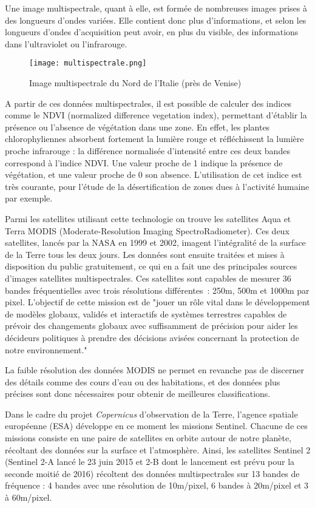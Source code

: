 Une image multispectrale, quant à elle, est formée de nombreuses images prises à des longueurs d'ondes variées. Elle contient donc plus d'informations, et selon les longueurs d'ondes d'acquisition peut avoir, en plus du visible, des informations dans l'ultraviolet ou l'infrarouge.

\begin{figure}
  \centering
    \texttt{[image: multispectrale.png]}
  \caption{Image multispectrale du Nord de l'Italie (près de Venise)}
  \label{fig:veniseMulti}
\end{figure}

A partir de ces données multispectrales, il est possible de calculer des indices comme le NDVI (normalized difference vegetation index), permettant d'établir la présence ou l'absence de végétation dans une zone. En effet, les plantes chlorophyliennes absorbent fortement la lumière rouge et réfléchissent la lumière proche infrarouge : la différence normalisée d'intensité entre ces deux bandes correspond à l'indice NDVI. Une valeur proche de 1 indique la présence de végétation, et une valeur proche de 0 son absence. L'utilisation de cet indice est très courante, pour l'étude de la désertification de zones dues à l'activité humaine\cite{desert} par exemple.

Parmi les satellites utilisant cette technologie on trouve les satellites Aqua et Terra MODIS (Moderate-Resolution Imaging SpectroRadiometer). Ces deux satellites, lancés par la NASA en 1999 et 2002, imagent l'intégralité de la surface de la Terre tous les deux jours. Les données sont ensuite traitées et mises à disposition du public gratuitement, ce qui en a fait une des principales sources d'images satellites multispectrales. Ces satellites sont capables de mesurer 36 bandes fréquentielles avec trois résolutions différentes : 250m, 500m et 1000m par pixel\cite{nasa}. L'objectif de cette mission est de "jouer un rôle vital dans le développement de modèles globaux, validés et interactifs de systèmes terrestres capables de prévoir des changements globaux avec suffisamment de précision pour aider les décideurs politiques à prendre des décisions avisées concernant la protection de notre environnement."

La faible résolution des données MODIS ne permet en revanche pas de discerner des détails comme des cours d'eau ou des habitations, et des données plus précises sont donc nécessaires pour obtenir de meilleures classifications. 

Dans le cadre du projet \textit{Copernicus} d'observation de la Terre, l'agence spatiale européenne (ESA) développe en ce moment les missions Sentinel. Chacune de ces missions consiste en une paire de satellites en orbite autour de notre planète, récoltant des données sur la surface et l'atmosphère. Ainsi, les satellites Sentinel 2 (Sentinel 2-A lancé le 23 juin 2015 et 2-B dont le lancement est prévu pour la seconde moitié de 2016)\cite{sent2} récoltent des données multispectrales sur 13 bandes de fréquence : 4 bandes avec une résolution de 10m/pixel, 6 bandes à 20m/pixel et 3 à 60m/pixel.


